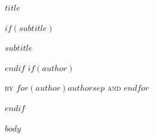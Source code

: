\documentclass[11pt]{article}
\title{}
\author{}
\date{}
\begin{document}
\thispagestyle{ssfirst}

\begin{center}
\vspace*{0.55in}
{\SSTitleFont{}\fontsize{19}{25}\selectfont\MakeUppercase{$title$}\par}
$if(subtitle)$
\vspace{0.12in}
{\itshape\large $subtitle$\par}
$endif$
$if(author)$
\vspace{0.2in}
{\scshape{}by $for(author)$$author$$sep$ and $endfor$\par}
$endif$
\vspace{0.42in}
\end{center}

$body$
\end{document}
